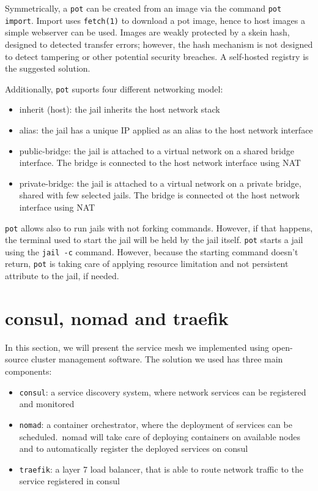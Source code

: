 \documentclass[conference,a4paper,11pt]{IEEEtran}
\begin{document}
Symmetrically, a \texttt{pot} can be created from an image via the command \texttt{pot import}. Import uses \texttt{fetch(1)} to download a pot image, hence to host images a simple webserver can be used. Images are weakly protected by a skein hash, designed to detected transfer errors; however, the hash mechanism is not designed to detect tampering or other potential security breaches. A self-hosted registry is the suggested solution.

Additionally, \texttt{pot} suports four different networking model:
\begin{itemize}
	\item inherit (host): the jail inherits the host network stack
	\item alias: the jail has a unique IP applied as an alias to the host network interface
	\item public-bridge: the jail is attached to a virtual network on a shared bridge interface. The bridge is connected to the host network interface using NAT
	\item private-bridge: the jail is attached to a virtual network on a private bridge, shared with few selected jails. The bridge is connected ot the host network interface using NAT
\end{itemize}

\texttt{pot} allows also to run jails with not forking commands. However, if that happens, the terminal used to start the jail will be held by the jail itself. \texttt{pot} starts a jail using the \texttt{jail -c} command. However, because the starting command doesn't return, \texttt{pot} is taking care of applying resource limitation and not persistent attribute to the jail, if needed.

\section{consul, nomad and traefik}\label{sec:ServiceMesh}
In this section, we will present the service mesh we implemented using open-source cluster management software. The solution we used has three main components:
\begin{itemize}
	\item \texttt{consul}: a service discovery system, where network services can be registered and monitored~\cite{consul}
	\item \texttt{nomad}: a container orchestrator, where the deployment of services can be scheduled.\ nomad will take care of deploying containers on available nodes and to automatically register the deployed services on consul~\cite{nomad}
	\item \texttt{traefik}: a layer 7 load balancer, that is able to route network traffic to the service registered in consul~\cite{traefik}
\end{itemize}
\end{document}

